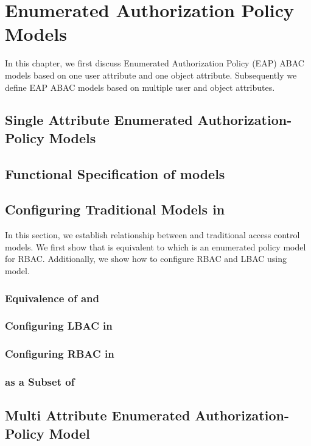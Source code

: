 \chapter{Enumerated Authorization Policy Models}
\label{sec:concepts}
In this chapter, we first discuss Enumerated Authorization Policy (EAP) ABAC models based on one user attribute and one object attribute. Subsequently we define EAP ABAC models based on multiple user and object attributes. 




	

\section{Single Attribute Enumerated Authorization-Policy Models}

	
\section{Functional Specification of \eapABAC{} models}
	
\section{Configuring Traditional Models in  \eapABAC{}}
	\label{sec:configuration}
	In this section, we establish relationship between \eapABAC{} and traditional access control models. We first show that \eapABAC{} is equivalent to \twoSortedRBAC{} which is an enumerated policy model for RBAC. Additionally, we show how to configure RBAC and LBAC using \eapABAC{} model.
\subsection{Equivalence of \eapABAC{}  and \twoSortedRBAC{} }
	
\subsection{Configuring LBAC in \eapABAC{}}
	
\subsection{Configuring RBAC in \eapABAC{}}
	
\subsection{\eapABAC{} as a Subset of \policyMachine{}}
	
\section{Multi Attribute Enumerated Authorization-Policy Model }
	
